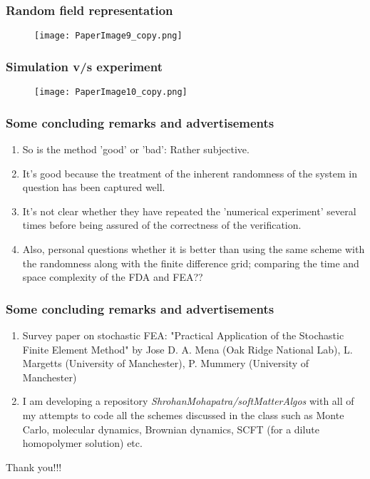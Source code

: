 \documentclass{beamer}
\begin{document}
\begin{frame}
\frametitle{Random field representation}
\begin{figure}
\texttt{[image: PaperImage9\_copy.png]}
\end{figure}
\end{frame}
\begin{frame}
\frametitle{Simulation v/s experiment}
\begin{figure}
\texttt{[image: PaperImage10\_copy.png]}
\end{figure}
\end{frame}
\begin{frame}
\frametitle{Some concluding remarks and advertisements}
\begin{enumerate}
	\item So is the method 'good' or 'bad': Rather subjective.
	\item It's good because the treatment of the inherent randomness of the system in question has been captured well.
	\item It's not clear whether they have repeated the 'numerical experiment' several times before being assured of the correctness of the verification.
	\item Also, personal questions whether it is better than using the same scheme with the randomness along with the finite difference grid; comparing the time and space complexity of the FDA and FEA??
\end{enumerate}
\end{frame}
\begin{frame}
\frametitle{Some concluding remarks and advertisements}
\begin{enumerate}
	\item Survey paper on stochastic FEA: "Practical Application of the Stochastic Finite Element Method" by Jose D. A. Mena (Oak Ridge National Lab), L. Margetts (University of Manchester), P. Mummery (University of Manchester)
	\item I am developing a repository \textit{ShrohanMohapatra/softMatterAlgos} with all of my attempts to code all the schemes discussed in the class such as Monte Carlo, molecular dynamics, Brownian dynamics, SCFT (for a dilute homopolymer solution) etc.
\end{enumerate}
\end{frame}
\begin{frame}
\begin{center}
Thank you!!!
\end{center}
\end{frame}
\end{document}
